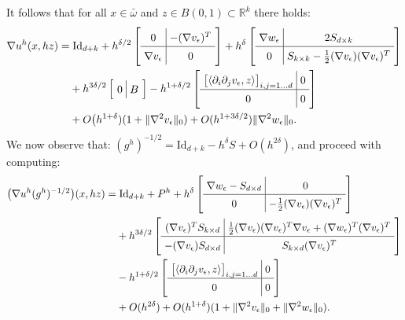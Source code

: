 \documentclass[reqno,twoside,11pt]{amsart}
\newcommand{\Id}{\mathrm{Id}}
\newcommand{\R}{\mathbb{R}}
\numberwithin{equation}{section}
\theoremstyle{plain}
\theoremstyle{definition}
\begin{document}
It follows that for all $x\in\bar\omega$ and $z\in B(0,1)\subset\R^k$ there holds:
\begin{equation*}
\arraycolsep=3.4pt\def\arraystretch{1.4}
\begin{split}
\nabla u^h(x, hz) = & \;\Id_{d+k} + h^{\delta/2} \left[\begin{array}{c|c} 
   0& -(\nabla v_\epsilon)^T\\ \hline \nabla v_\epsilon &0 \end{array}\right] +
h^\delta \left[\begin{array}{c|c} \nabla w_\epsilon & 2S_{d\times k} \\ \hline 0 &
    S_{k\times k}-\frac{1}{2}(\nabla v_\epsilon)(\nabla  v_\epsilon)^T\end{array}\right] 
\\ & + h^{3\delta/2} \left[\begin{array}{c|c}   0& B \end{array}\right]
- h^{1+\delta/2} \left[\begin{array}{c|c} \big[\langle\partial_i\partial_j
    v_\epsilon,z\rangle\big]_{i,j=1\ldots d} &0\\ \hline 0&0\end{array}\right]
\\ & +{O}\big(h^{1+\delta})(1+ \|\nabla^2v_\epsilon\|_0)+O(h^{1+3\delta/2})\|\nabla^2w_\epsilon\|_0.
\end{split}
\end{equation*}
We now observe that: $(g^h)^{-1/2}=\Id_{d+k} - h^\delta S + {O}(h^{2\delta})$, and proceed with computing:
\begin{equation*}
\arraycolsep=3.4pt\def\arraystretch{1.4}
\begin{split}
\big(\nabla u^h(g^h)^{-1/2}\big)(x, hz) = & \;\Id_{d+k} + P^h +
h^\delta \left[\begin{array}{c|c} \nabla w_\epsilon -S_{d\times d} & 0 \\ \hline 0 &
-\frac{1}{2}(\nabla v_\epsilon)(\nabla v_\epsilon)^T\end{array}\right] \\ & +
h^{3\delta/2} \left[\begin{array}{c|c} (\nabla v_\epsilon)^T S_{k\times d} &
    \frac{1}{2}(\nabla v_\epsilon)(\nabla v_\epsilon)^T\nabla v_\epsilon + (\nabla
    w_\epsilon)^T(\nabla v_\epsilon)^T\\ \hline -(\nabla v_\epsilon)S_{d\times d} &
S_{k\times d} (\nabla v_\epsilon)^T\end{array}\right] \\ &
-  h^{1+\delta/2}\left[\begin{array}{c|c} \big[\langle\partial_i\partial_j
    v_\epsilon,z\rangle\big]_{i,j=1\ldots d}  &0\\ \hline 0&0\end{array}\right]\\ & 
+{O}(h^{2\delta})  +{O}(h^{1+\delta}) (1+ \|\nabla^2v_\epsilon\|_0+\|\nabla^2w_\epsilon\|_0).
\end{split}
\end{equation*}
\end{document}

